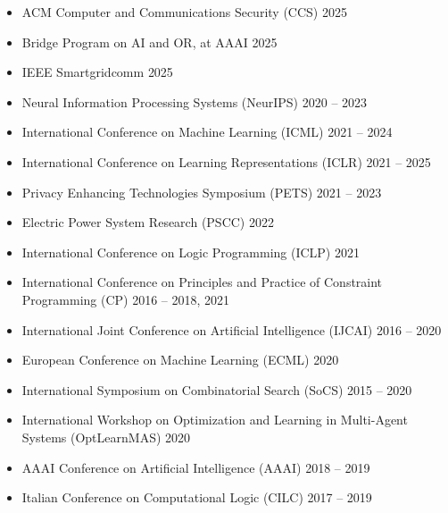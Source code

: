 \begin{itemize}
  \item ACM Computer and Communications Security (CCS)
  \hfill {2025}

  \item Bridge Program on AI and OR, at AAAI
  \hfill {2025}

  \item IEEE Smartgridcomm
  \hfill{2025}

  \item Neural Information Processing Systems (NeurIPS) 
  \hfill {2020 -- 2023}

  \item International Conference on Machine Learning (ICML) 
  \hfill{2021 -- 2024} 

  \item International Conference on Learning Representations (ICLR)
  \hfill{2021 -- 2025}

  \item Privacy Enhancing Technologies Symposium (PETS) 
  \hfill {2021 -- 2023}

  \item Electric Power System Research (PSCC)
  \hfill{2022}

  \item International Conference on Logic Programming (ICLP) 
  \hfill {2021}

  \item International Conference on Principles and Practice of Constraint Programming (CP) 
  \hfill{2016 -- 2018, 2021} 

  \item International Joint Conference on Artificial Intelligence (IJCAI) 
  \hfill {2016 -- 2020}

  \item European Conference on Machine Learning (ECML) 
  \hfill {2020}

  \item International Symposium on Combinatorial Search (SoCS) 
  \hfill {2015 -- 2020}

  \item International Workshop on Optimization and Learning in 
        Multi-Agent Systems (OptLearnMAS) 
  \hfill {2020}

  \item AAAI Conference on Artificial Intelligence (AAAI) 
  \hfill {2018 -- 2019}

  \item Italian Conference on Computational Logic (CILC) 
  \hfill {2017 -- 2019}


\end{itemize}
